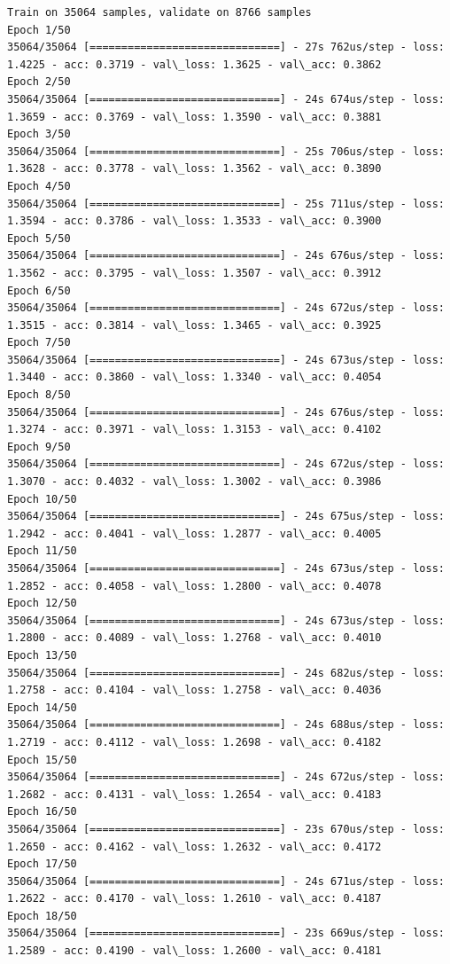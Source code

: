 \documentclass[11pt]{article}
\begin{document}
    \begin{Verbatim}[commandchars=\\\{\}]
Train on 35064 samples, validate on 8766 samples
Epoch 1/50
35064/35064 [==============================] - 27s 762us/step - loss: 1.4225 - acc: 0.3719 - val\_loss: 1.3625 - val\_acc: 0.3862
Epoch 2/50
35064/35064 [==============================] - 24s 674us/step - loss: 1.3659 - acc: 0.3769 - val\_loss: 1.3590 - val\_acc: 0.3881
Epoch 3/50
35064/35064 [==============================] - 25s 706us/step - loss: 1.3628 - acc: 0.3778 - val\_loss: 1.3562 - val\_acc: 0.3890
Epoch 4/50
35064/35064 [==============================] - 25s 711us/step - loss: 1.3594 - acc: 0.3786 - val\_loss: 1.3533 - val\_acc: 0.3900
Epoch 5/50
35064/35064 [==============================] - 24s 676us/step - loss: 1.3562 - acc: 0.3795 - val\_loss: 1.3507 - val\_acc: 0.3912
Epoch 6/50
35064/35064 [==============================] - 24s 672us/step - loss: 1.3515 - acc: 0.3814 - val\_loss: 1.3465 - val\_acc: 0.3925
Epoch 7/50
35064/35064 [==============================] - 24s 673us/step - loss: 1.3440 - acc: 0.3860 - val\_loss: 1.3340 - val\_acc: 0.4054
Epoch 8/50
35064/35064 [==============================] - 24s 676us/step - loss: 1.3274 - acc: 0.3971 - val\_loss: 1.3153 - val\_acc: 0.4102
Epoch 9/50
35064/35064 [==============================] - 24s 672us/step - loss: 1.3070 - acc: 0.4032 - val\_loss: 1.3002 - val\_acc: 0.3986
Epoch 10/50
35064/35064 [==============================] - 24s 675us/step - loss: 1.2942 - acc: 0.4041 - val\_loss: 1.2877 - val\_acc: 0.4005
Epoch 11/50
35064/35064 [==============================] - 24s 673us/step - loss: 1.2852 - acc: 0.4058 - val\_loss: 1.2800 - val\_acc: 0.4078
Epoch 12/50
35064/35064 [==============================] - 24s 673us/step - loss: 1.2800 - acc: 0.4089 - val\_loss: 1.2768 - val\_acc: 0.4010
Epoch 13/50
35064/35064 [==============================] - 24s 682us/step - loss: 1.2758 - acc: 0.4104 - val\_loss: 1.2758 - val\_acc: 0.4036
Epoch 14/50
35064/35064 [==============================] - 24s 688us/step - loss: 1.2719 - acc: 0.4112 - val\_loss: 1.2698 - val\_acc: 0.4182
Epoch 15/50
35064/35064 [==============================] - 24s 672us/step - loss: 1.2682 - acc: 0.4131 - val\_loss: 1.2654 - val\_acc: 0.4183
Epoch 16/50
35064/35064 [==============================] - 23s 670us/step - loss: 1.2650 - acc: 0.4162 - val\_loss: 1.2632 - val\_acc: 0.4172
Epoch 17/50
35064/35064 [==============================] - 24s 671us/step - loss: 1.2622 - acc: 0.4170 - val\_loss: 1.2610 - val\_acc: 0.4187
Epoch 18/50
35064/35064 [==============================] - 23s 669us/step - loss: 1.2589 - acc: 0.4190 - val\_loss: 1.2600 - val\_acc: 0.4181

\end{Verbatim}
\end{document}
